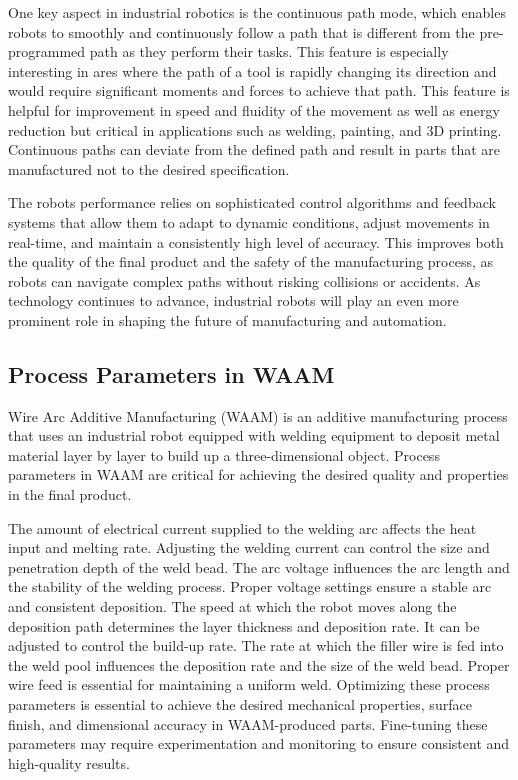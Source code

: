 \documentclass[ZLstudentexpose%
              ,optBiber%
              ,optEnglish%
              ,10pt
              ]{ZLlatex}%
\begin{document}
One key aspect in industrial robotics is the continuous path mode, which enables robots to smoothly and continuously follow a path that is different from the pre-programmed path as they perform their tasks. This feature is especially interesting in ares where the path of a tool is rapidly changing its direction and would require significant moments and forces to achieve that path.
This feature is helpful for improvement in speed and fluidity of the movement as well as energy reduction but critical in applications such as welding, painting, and 3D printing. Continuous paths can deviate from the defined path and result in parts that are manufactured not to the desired specification. 

The robots performance relies on sophisticated control algorithms and feedback systems that allow them to adapt to dynamic conditions, adjust movements in real-time, and maintain a consistently high level of accuracy. This improves both the quality of the final product and the safety of the manufacturing process, as robots can navigate complex paths without risking collisions or accidents.
As technology continues to advance, industrial robots will play an even more prominent role in shaping the future of manufacturing and automation.


\subsection{Process Parameters in WAAM}
Wire Arc Additive Manufacturing (WAAM) is an additive manufacturing process that uses an industrial robot equipped with welding equipment to deposit metal material layer by layer to build up a three-dimensional object. Process parameters in WAAM are critical for achieving the desired quality and properties in the final product.

The amount of electrical current supplied to the welding arc affects the heat input and melting rate. Adjusting the welding current can control the size and penetration depth of the weld bead. The arc voltage influences the arc length and the stability of the welding process. Proper voltage settings ensure a stable arc and consistent deposition. The speed at which the robot moves along the deposition path determines the layer thickness and deposition rate. It can be adjusted to control the build-up rate.
The rate at which the filler wire is fed into the weld pool influences the deposition rate and the size of the weld bead. Proper wire feed is essential for maintaining a uniform weld. Optimizing these process parameters is essential to achieve the desired mechanical properties, surface finish, and dimensional accuracy in WAAM-produced parts. Fine-tuning these parameters may require experimentation and monitoring to ensure consistent and high-quality results.
\end{document}
